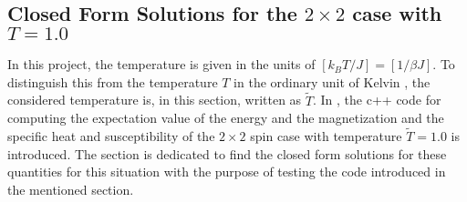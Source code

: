 \subsection{Closed Form Solutions for the $2\times 2$ case with $T=1.0$}
\label{sec:ClosedFormSolution2times2T1}
In this project, the temperature is given in the units of $[k_B T/J] = [1/\beta J]$.
To distinguish this from the temperature $T$ in the ordinary unit of Kelvin , the considered temperature is, in this section, written as $\tilde{T}$.
In , the c++ code for computing the expectation value of the energy and the magnetization and the specific heat and susceptibility of the $2\times 2$ spin case with temperature $\tilde{T} = 1.0$ is introduced.
The section is dedicated to find the closed form solutions for these quantities for this situation with the purpose of testing the code introduced in the mentioned section. 

